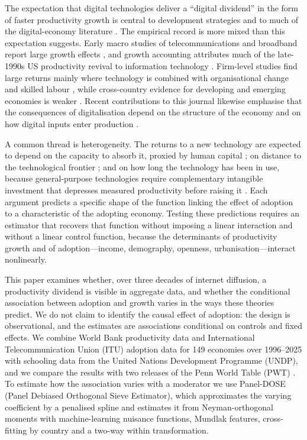 \documentclass[preprint,12pt,authoryear]{elsarticle}
\begin{document}
The expectation that digital technologies deliver a ``digital dividend'' in the form of faster productivity growth is central to development strategies and to much of the digital-economy literature \citep{worldbank2016wdr,goldfarb2019digital}. The empirical record is more mixed than this expectation suggests. Early macro studies of telecommunications and broadband report large growth effects \citep{roller2001telecom,koutroumpis2009broadband,czernich2011broadband}, and growth accounting attributes much of the late-1990s US productivity revival to information technology \citep{jorgenson2008retro,jorgenson2016ict}. Firm-level studies find large returns mainly where technology is combined with organisational change and skilled labour \citep{brynjolfsson2000beyond,bresnahan2002it,bloom2012americans}, while cross-country evidence for developing and emerging economies is weaker \citep{niebel2018ict,vu2020ict,cardona2013ict}. Recent contributions to this journal likewise emphasise that the consequences of digitalisation depend on the structure of the economy and on how digital inputs enter production \citep{banga2026digitalisation,chen2026production}.

A common thread is heterogeneity. The returns to a new technology are expected to depend on the capacity to absorb it, proxied by human capital \citep{nelson1966,benhabib1994,cohen1990absorptive}; on distance to the technological frontier \citep{acemoglu2006frontier}; and on how long the technology has been in use, because general-purpose technologies require complementary intangible investment that depresses measured productivity before raising it \citep{brynjolfsson2021jcurve}. Each argument predicts a specific shape of the function linking the effect of adoption to a characteristic of the adopting economy. Testing these predictions requires an estimator that recovers that function without imposing a linear interaction and without a linear control function, because the determinants of productivity growth and of adoption---income, demography, openness, urbanisation---interact nonlinearly.

This paper examines whether, over three decades of internet diffusion, a productivity dividend is visible in aggregate data, and whether the conditional association between adoption and growth varies in the ways these theories predict. We do not claim to identify the causal effect of adoption: the design is observational, and the estimates are associations conditional on controls and fixed effects. We combine World Bank productivity data and International Telecommunication Union (ITU) adoption data for 149 economies over 1996--2025 with schooling data from the United Nations Development Programme (UNDP), and we compare the results with two releases of the Penn World Table (PWT) \citep{feenstra2015pwt,pwt11}. To estimate how the association varies with a moderator we use Panel-DOSE (Panel Debiased Orthogonal Sieve Estimator), which approximates the varying coefficient by a penalised spline and estimates it from Neyman-orthogonal moments with machine-learning nuisance functions, Mundlak features, cross-fitting by country and a two-way within transformation.
\end{document}
